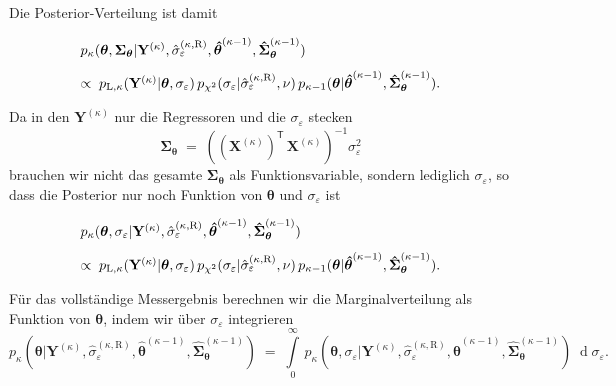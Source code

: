 Die Posterior-Verteilung ist damit
\begin{equation}
\arraycolsep=2.0pt\def\arraystretch{2.0}
\begin{array}{l}
p_{\kappa}(\boldsymbol{\theta}, \boldsymbol{\Sigma}_{\boldsymbol{\theta}} | \mathbf{Y}^{(\kappa)}, \hat \sigma_{\varepsilon}^{(\kappa,\mathrm{R})},  \boldsymbol{\hat \theta}^{(\kappa-1)},  \boldsymbol{\hat \Sigma}^{(\kappa-1)}_{\boldsymbol{\theta}}) \\
\propto
\; p_{\mathrm{L},\kappa} (\mathbf{Y}^{(\kappa)} | \boldsymbol{\theta}, \sigma_{\varepsilon}) \,
p_{\chi^2} (\sigma_{\varepsilon} | \hat \sigma_{\varepsilon}^{(\kappa,\mathrm{R})}, \nu) \,
p_{\kappa-1}(\boldsymbol{\theta} | \boldsymbol{\hat \theta}^{(\kappa-1)}, 
\boldsymbol{\hat \Sigma}^{(\kappa-1)}_{\boldsymbol{\theta}})  .
\end{array}
\end{equation}
Da in den $\mathbf{Y}^{(\kappa)}$ nur die Regressoren und die $\sigma_{\varepsilon}$ stecken
$$
\boldsymbol{\Sigma}_{\boldsymbol{\theta}} \; = \;
\left( \left(\mathbf{X}^{(\kappa)}\right)^\mathsf{T} \, \mathbf{X}^{(\kappa)} \right)^{-1} 
\sigma_{\varepsilon}^2 
$$
brauchen wir nicht das gesamte $\boldsymbol{\Sigma}_{\boldsymbol{\theta}}$ als Funktionsvariable,
sondern lediglich $\sigma_{\varepsilon}$, so dass die Posterior nur noch
Funktion von $\boldsymbol{\theta}$ und $\sigma_{\varepsilon}$ ist
\begin{equation}
\arraycolsep=2.0pt\def\arraystretch{2.0}
\begin{array}{l}
p_{\kappa}(\boldsymbol{\theta}, \sigma_{\varepsilon} | \mathbf{Y}^{(\kappa)}, \hat \sigma_{\varepsilon}^{(\kappa,\mathrm{R})},  \boldsymbol{\hat \theta}^{(\kappa-1)},  \boldsymbol{\hat \Sigma}^{(\kappa-1)}_{\boldsymbol{\theta}}) \\
\propto
\; p_{\mathrm{L},\kappa} (\mathbf{Y}^{(\kappa)} | \boldsymbol{\theta}, \sigma_{\varepsilon}) \,
p_{\chi^2} (\sigma_{\varepsilon} | \hat \sigma_{\varepsilon}^{(\kappa,\mathrm{R})}, \nu) \,
p_{\kappa-1}(\boldsymbol{\theta} | \boldsymbol{\hat \theta}^{(\kappa-1)}, 
\boldsymbol{\hat \Sigma}^{(\kappa-1)}_{\boldsymbol{\theta}})  .
\end{array}
\label{posteriorRegression}
\end{equation}
Für das vollständige Messergebnis berechnen wir die Marginalverteilung als Funktion von
$\boldsymbol{\theta}$, indem wir über $\sigma_{\varepsilon}$ integrieren
\begin{equation}
p_{\kappa}(\boldsymbol{\theta}| \mathbf{Y}^{(\kappa)}, \hat \sigma_{\varepsilon}^{(\kappa,\mathrm{R})},  \boldsymbol{\hat \theta}^{(\kappa-1)},  \boldsymbol{\hat \Sigma}^{(\kappa-1)}_{\boldsymbol{\theta}}) \; = \; 
\int\limits_0^\infty \, p_{\kappa}(\boldsymbol{\theta}, \sigma_{\varepsilon} | \mathbf{Y}^{(\kappa)}, \hat \sigma_{\varepsilon}^{(\kappa,\mathrm{R})},  \boldsymbol{\hat \theta}^{(\kappa-1)},  \boldsymbol{\hat \Sigma}^{(\kappa-1)}_{\boldsymbol{\theta}}) \;
\operatorname{d}\sigma_{\varepsilon} .
\end{equation}

